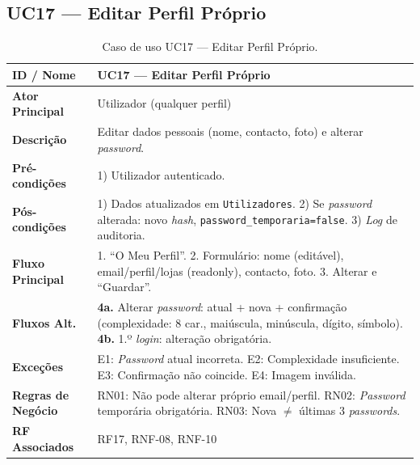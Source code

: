 \documentclass[a4paper,12pt]{scrreprt}
\begin{document}
\subsection*{UC17 --- Editar Perfil Próprio}
\begin{table}[H]
\centering\small
\begin{tabular}{|p{3cm}|p{11cm}|}
\hline
\textbf{ID / Nome} & UC17 --- Editar Perfil Próprio \\
\hline
\textbf{Ator Principal} & Utilizador (qualquer perfil) \\
\hline
\textbf{Descrição} & Editar dados pessoais (nome, contacto, foto) e alterar \textit{password}. \\
\hline
\textbf{Pré-condições} & 1) Utilizador autenticado. \\
\hline
\textbf{Pós-condições} & 1) Dados atualizados em \texttt{Utilizadores}. 2) Se \textit{password} alterada: novo \textit{hash}, \texttt{password\_temporaria=false}. 3) \textit{Log} de auditoria. \\
\hline
\textbf{Fluxo Principal} & 1. ``O Meu Perfil''. 2. Formulário: nome (editável), email/perfil/lojas (readonly), contacto, foto. 3. Alterar e ``Guardar''. \\
\hline
\textbf{Fluxos Alt.} & \textbf{4a.} Alterar \textit{password}: atual + nova + confirmação (complexidade: 8 car., maiúscula, minúscula, dígito, símbolo). \textbf{4b.} 1.º \textit{login}: alteração obrigatória. \\
\hline
\textbf{Exceções} & E1: \textit{Password} atual incorreta. E2: Complexidade insuficiente. E3: Confirmação não coincide. E4: Imagem inválida. \\
\hline
\textbf{Regras de Negócio} & RN01: Não pode alterar próprio email/perfil. RN02: \textit{Password} temporária obrigatória. RN03: Nova $\neq$ últimas 3 \textit{passwords}. \\
\hline
\textbf{RF Associados} & RF17, RNF-08, RNF-10 \\
\hline
\end{tabular}
\caption{Caso de uso UC17 --- Editar Perfil Próprio.}
\end{table}

\end{document}

